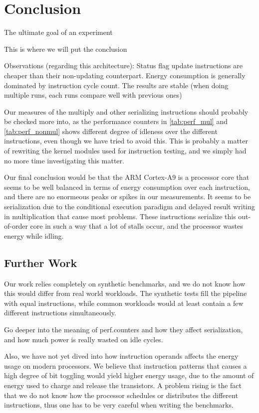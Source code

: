 \section{Conclusion}
The ultimate goal of an experiment 


This is where we will put the conclusion

Observations (regarding this architecture):
Status flag update instructions are cheaper than their non-updating counterpart.
Energy consumption is generally dominated by instruction cycle count.
The results are stable (when doing multiple runs, each runs compare well with
        previous ones)

Our measures of the multiply and other serializing instructions should probably
be checked more into, as the performance counters in \autoref{tab:perf_mul} and
\autoref{tab:perf_nonmul} shows different degree of idleness over the different
instructions, even though we have tried to avoid this.  This is probably a
matter of rewriting the kernel modules used for instruction testing, and we
simply had no more time investigating this matter.

Our final conclusion would be that the ARM Cortex-A9 is a processor core that
seems to be well balanced in terms of energy consumption over each instruction,
and there are no enormeous peaks or spikes in our measurements. It seems to be
serialization due to the conditional execution paradigm and delayed result
writing in multiplication that cause most problems. These instructions serialize
this out-of-order core in such a way that a lot of stalls occur, and the
processor wastes energy while idling.



\subsection{Further Work}

Our work relies completely on synthetic benchmarks, and we do not know how this
would differ from real world workloads. The synthetic tests fill the pipeline
with equal instructions, while common workloads would at least contain a few
different instructions simultaneously.

 Go deeper into the meaning of perf.counters and how they affect serialization, and
how much power is really wasted on idle cycles.

Also, we have not yet dived into how instruction operands affects the energy usage on
modern processors. We believe that instruction patterns that causes a high
degree of bit toggling would yield higher energy usage, due to the amount of
energy used to charge and release the transistors. A problem rising is the fact
that we do not know how the processor schedules or distributes the different
instructions, thus one has to be very careful when writing the benchmarks.


